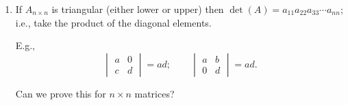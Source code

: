 \documentclass[reqno]{amsart}
\theoremstyle{definition}
\begin{document}
\begin{enumerate}
\pagebreak

\item  If $A_{n \times n}$ is triangular (either lower or upper) then $\det(A) = a_{11}a_{22}a_{33}\cdots a_{nn}$; i.e.,
take the product of the diagonal elements.

E.g.,
\begin{equation*}
\begin{vmatrix}
a & 0\\
c & d
\end{vmatrix} = ad;\qquad \begin{vmatrix}
a & b\\
0 & d
\end{vmatrix} = ad.
\end{equation*}

Can we prove this for $n \times n$ matrices?


\end{enumerate}
\end{document}
